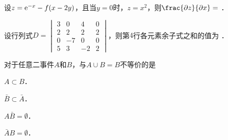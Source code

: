 \documentclass[plain,noanswer,medmath]{../../template/jnuexam}
\begin{document}








\begin{problem}
设$z = \mathrm{e}^{- x} - f(x - 2y)$，且当$y = 0$时，$z = x^2$，则$\frac{\pdz}{\pdx} =$ \fillin{}．
\end{problem}


\begin{problem}
设行列式$D = \begin{vmatrix}
  3 &  0 &  4 & 0 \\
  2 &  2 &  2 & 2 \\
  0 & -7 &  0 & 0 \\
  5 &  3 & -2 & 2
\end{vmatrix}$，则第$4$行各元素余子式之和的值为 \fillin{}．
\end{problem}














\begin{problem}
对于任意二事件$A$和$B$，与$A \cup B = B$不等价的是\pickout{}
\begin{abcd}
\item $A \subset B$．
\item $\bar B \subset \bar A$．
\item $A\bar B = \emptyset$．
\item $\bar AB = \emptyset$．
\end{abcd}
\end{problem}








\end{document}
